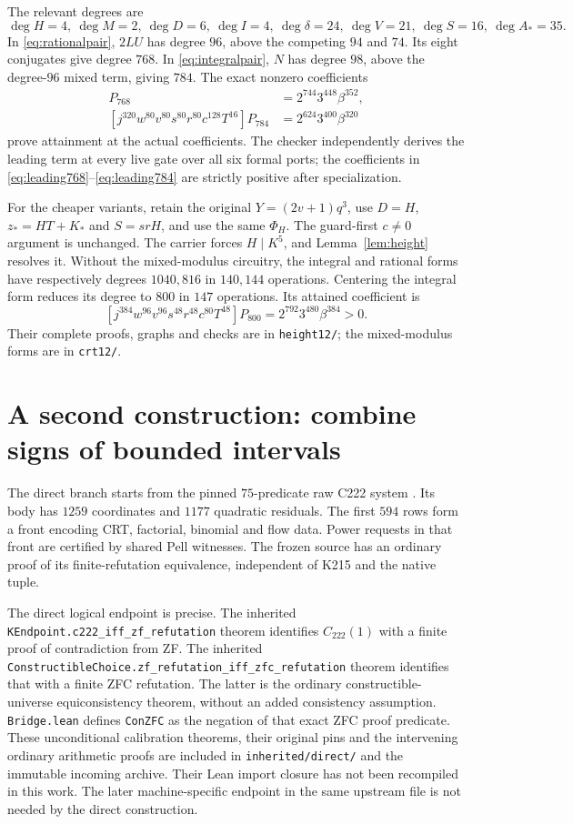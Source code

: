 \documentclass[11pt]{article}
\newcommand{\file}[1]{\nolinkurl{#1}}
\theoremstyle{definition}\newtheorem{definition}[theorem]{Definition}
\theoremstyle{remark}\newtheorem{remark}[theorem]{Remark}
\begin{document}
The relevant degrees are
\[
 \deg H=4,\ \deg M=2,\ \deg D=6,\ \deg I=4,
 \ \deg\delta=24,\ \deg V=21,\ \deg S=16,\ \deg A_*=35.
\]
In \eqref{eq:rationalpair}, $2LU$ has degree $96$, above the competing
$94$ and $74$. Its eight conjugates give degree $768$. In
\eqref{eq:integralpair}, $N$ has degree $98$, above the degree-$96$
mixed term, giving $784$. The exact nonzero coefficients
\begin{align}
 [j^{352}w^{96}v^{96}s^{48}r^{48}c^{80}T^{48}]P_{768}
 &=2^{744}3^{448}\beta^{352},\label{eq:leading768}\\
 [j^{320}w^{80}v^{80}s^{80}r^{80}c^{128}T^{16}]P_{784}
 &=2^{624}3^{400}\beta^{320}\label{eq:leading784}
\end{align}
prove attainment at the actual coefficients. The checker independently
derives the leading term at every live gate over all six formal ports;
the coefficients in \eqref{eq:leading768}--\eqref{eq:leading784} are
strictly positive after specialization.

For the cheaper variants, retain the original
$Y=(2v+1)q^3$, use $D=H$, $z_*=HT+K_*$ and $S=srH$, and use the same
$\Phi_H$. The guard-first $c\ne0$ argument is unchanged. The carrier
forces $H\mid K^5$, and Lemma~\ref{lem:height} resolves it. Without the
mixed-modulus circuitry, the integral and rational forms have respectively
degrees $1040,816$ in $140,144$ operations. Centering the integral form
reduces its degree to $800$ in $147$ operations. Its attained coefficient is
\[
 [j^{384}w^{96}v^{96}s^{48}r^{48}c^{80}T^{48}]P_{800}
 =2^{792}3^{480}\beta^{384}>0.
\]
Their complete proofs, graphs and checks are in \file{height12/};
the mixed-modulus forms are in \file{crt12/}.

\section{A second construction: combine signs of bounded intervals}

The direct branch starts from the pinned $75$-predicate raw C222 system
\cite{direct}. Its body has $1259$ coordinates and $1177$ quadratic
residuals. The first $594$ rows form a front encoding CRT, factorial,
binomial and flow data. Power requests in that front are certified by
shared Pell witnesses. The frozen source has an ordinary proof of its
finite-refutation equivalence, independent of K215 and the native tuple.

The direct logical endpoint is precise. The inherited
\file{KEndpoint.c222_iff_zf_refutation} theorem identifies
$C_{222}(1)$ with a finite proof of contradiction from ZF. The inherited
\file{ConstructibleChoice.zf_refutation_iff_zfc_refutation} theorem
identifies that with a finite ZFC refutation. The latter is the ordinary
constructible-universe equiconsistency theorem, without an added
consistency assumption. \file{Bridge.lean} defines \file{ConZFC} as the
negation of that exact ZFC proof predicate. These unconditional
calibration theorems, their original pins and the intervening ordinary
arithmetic proofs are included in \file{inherited/direct/} and the
immutable incoming archive. Their Lean import closure has not been
recompiled in this work. The later machine-specific endpoint in the
same upstream file is not needed by the direct construction.
\end{document}
